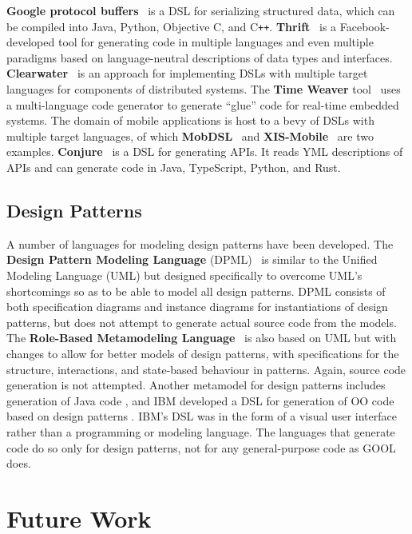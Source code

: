 \documentclass[sigplan,review,anonymous,prologue,dvipsnames]{acmart}
\newcommand{\Cplusplus}{C\texttt{++}}
\begin{document}
\textbf{Google protocol buffers}~\cite{Protobuf} is a DSL for serializing
structured data, which can be compiled into Java, Python, Objective C, and
\Cplusplus.  \textbf{Thrift}~\cite{slee2007thrift} is a Facebook-developed tool
for generating code in multiple languages and even multiple paradigms based on
language-neutral descriptions of data types and interfaces.
\textbf{Clearwater}~\cite{swint2005clearwater} is an approach for implementing
DSLs with multiple target languages for components of distributed systems.  The
\textbf{Time Weaver} tool~\cite{de2004glue} uses a multi-language code
generator to generate ``glue'' code for real-time embedded systems.  The domain
of mobile applications is host to a bevy of DSLs with multiple target
languages, of which \textbf{MobDSL}~\cite{kramer2010mobdsl} and
\textbf{XIS-Mobile}~\cite{ribeiro2014xis} are two examples.
\textbf{Conjure}~\cite{Conjure} is a DSL for generating APIs. It reads YML
descriptions of APIs and can generate code in Java, TypeScript, Python, and
Rust.

\subsection{Design Patterns}

A number of languages for modeling design patterns have been developed. The
\textbf{Design Pattern Modeling Language} (DPML)~\cite{mapelsden2002design} is similar
to the Unified Modeling Language (UML) but designed specifically to overcome
UML's shortcomings so as to be able to model all design patterns. DPML consists of
both specification diagrams and instance diagrams for instantiations of design
patterns, but does not attempt to generate actual source code from the models.
The \textbf{Role-Based Metamodeling Language}~\cite{kim2003uml} is also based on UML but
with changes to allow for better models of design patterns, with specifications
for the structure, interactions, and state-based behaviour in patterns. Again,
source code generation is not attempted. Another metamodel for design patterns
includes generation of Java code \cite{albin2001meta}, and IBM developed a DSL
for generation of OO code based on design patterns
\cite{budinsky1996automatic}. IBM's DSL was in the form of a visual user
interface rather than a programming or modeling language. The languages that
generate code do so only for design patterns, not for any general-purpose code
as GOOL does.

\section{Future Work} \label{sec:future}
\end{document}
